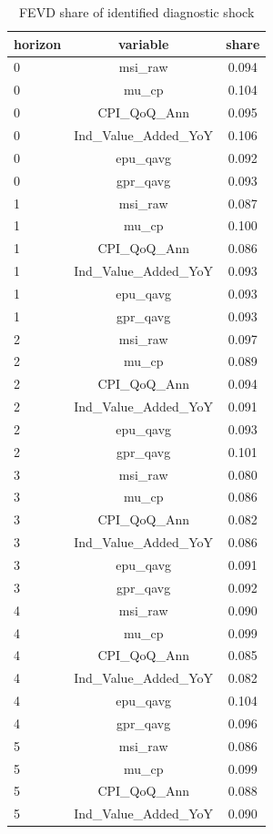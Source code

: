 \begin{table}[!htbp]
\centering
\caption{FEVD share of identified diagnostic shock}
\label{tab:bvar_fevd}
\begin{threeparttable}
\begin{tabular}{lcc}
\toprule
horizon & variable & share \\
\midrule
0 & msi\_raw & 0.094 \\
0 & mu\_cp & 0.104 \\
0 & CPI\_QoQ\_Ann & 0.095 \\
0 & Ind\_Value\_Added\_YoY & 0.106 \\
0 & epu\_qavg & 0.092 \\
0 & gpr\_qavg & 0.093 \\
1 & msi\_raw & 0.087 \\
1 & mu\_cp & 0.100 \\
1 & CPI\_QoQ\_Ann & 0.086 \\
1 & Ind\_Value\_Added\_YoY & 0.093 \\
1 & epu\_qavg & 0.093 \\
1 & gpr\_qavg & 0.093 \\
2 & msi\_raw & 0.097 \\
2 & mu\_cp & 0.089 \\
2 & CPI\_QoQ\_Ann & 0.094 \\
2 & Ind\_Value\_Added\_YoY & 0.091 \\
2 & epu\_qavg & 0.093 \\
2 & gpr\_qavg & 0.101 \\
3 & msi\_raw & 0.080 \\
3 & mu\_cp & 0.086 \\
3 & CPI\_QoQ\_Ann & 0.082 \\
3 & Ind\_Value\_Added\_YoY & 0.086 \\
3 & epu\_qavg & 0.091 \\
3 & gpr\_qavg & 0.092 \\
4 & msi\_raw & 0.090 \\
4 & mu\_cp & 0.099 \\
4 & CPI\_QoQ\_Ann & 0.085 \\
4 & Ind\_Value\_Added\_YoY & 0.082 \\
4 & epu\_qavg & 0.104 \\
4 & gpr\_qavg & 0.096 \\
5 & msi\_raw & 0.086 \\
5 & mu\_cp & 0.099 \\
5 & CPI\_QoQ\_Ann & 0.088 \\
5 & Ind\_Value\_Added\_YoY & 0.090 \\

\end{tabular}
\end{threeparttable}
\end{table}
